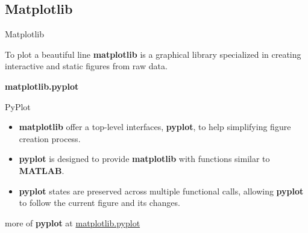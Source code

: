 \documentclass{beamer}
\begin{document}
    \subsection{Matplotlib}
    \begin{frame}[fragile]{Matplotlib}
        \begin{block}{To plot a beautiful line}
            \textbf{matplotlib} is a graphical library specialized in creating interactive and static figures from raw data. 
        \end{block}
        \pause
        \textbf{matplotlib.pyplot}
        \begin{block}{PyPlot}
            \begin{itemize}
                \item \textbf{matplotlib} offer a top-level interfaces, \textbf{pyplot}, to help simplifying figure creation process.
                \item \textbf{pyplot} is designed to provide \textbf{matplotlib} with functions similar to \textbf{MATLAB}.
                \item \textbf{pyplot} states are preserved across multiple functional calls, allowing \textbf{pyplot} to follow the current figure and its changes.
            \end{itemize}
        \end{block}
        more of \textbf{pyplot} at \href{https://matplotlib.org/stable/api/_as_gen/matplotlib.pyplot.html}{matplotlib.pyplot}
    \end{frame}
\end{document}
